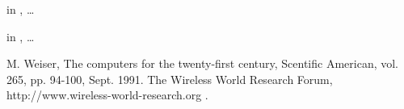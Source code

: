\documentclass[a4paper,12pt]{article}
\begin{document}
in \cite{bib:ubi91weiser,bib:wwrf}, \ldots

in \cite[pp. 99-105]{bib:wwrf}, \ldots

\begin{thebibliography}{10}
  M. Weiser, 
  The computers for the twenty-first century, 
  Scentific American, 
  vol. 265, pp. 94-100, Sept. 1991.
  The Wireless World Research Forum, 
  http://www.wireless-world-research.org .
\end{thebibliography}
\end{document}
